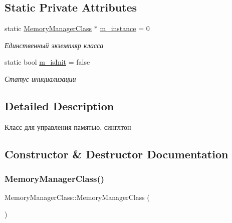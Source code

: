 \subsection*{Static Private Attributes}
\begin{DoxyCompactItemize}
\item 
static \hyperlink{class_memory_manager_class}{Memory\+Manager\+Class} $\ast$ \hyperlink{class_memory_manager_class_ab7ef4f180d7d5cf6cbe60e008f8bba48}{m\+\_\+instance} = 0
\begin{DoxyCompactList}\small\item\em Единственный экземпляр класса \end{DoxyCompactList}\item 
static bool \hyperlink{class_memory_manager_class_af7bdf2120dce6b57281f2da92ad0d2be}{m\+\_\+is\+Init} = false
\begin{DoxyCompactList}\small\item\em Статус инициализации \end{DoxyCompactList}\end{DoxyCompactItemize}


\subsection{Detailed Description}
Класс для управления памятью, синглтон 

\subsection{Constructor \& Destructor Documentation}
\mbox{\label{class_memory_manager_class_a6240ddcc63f726fd26af2c15be9d24ac}} 
\subsubsection{\texorpdfstring{Memory\+Manager\+Class()}{MemoryManagerClass()}\hspace{0.1cm}{\footnotesize\ttfamily [1/2]}}
{\footnotesize\ttfamily Memory\+Manager\+Class\+::\+Memory\+Manager\+Class (\begin{DoxyParamCaption}{ }\end{DoxyParamCaption})\hspace{0.3cm}{\ttfamily [private]}}

